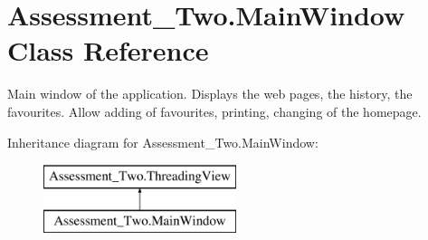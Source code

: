 \hypertarget{class_assessment___two_1_1_main_window}{
\section{Assessment\_\-Two.MainWindow Class Reference}
\label{class_assessment___two_1_1_main_window}
}


Main window of the application. Displays the web pages, the history, the favourites. Allow adding of favourites, printing, changing of the homepage.  


Inheritance diagram for Assessment\_\-Two.MainWindow:\begin{figure}[H]
\begin{center}
\leavevmode
\includegraphics[height=2.000000cm]{class_assessment___two_1_1_main_window}
\end{center}
\end{figure}
